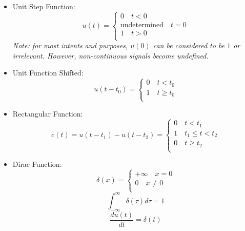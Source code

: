 \documentclass[nobib]{tufte-handout}
\begin{document}
\begin{itemize}
    \item Unit Step Function:
          \begin{equation*}
              u(t) = \left\{
              \begin{array}{l}
                  0 \quad t < 0                 \\
                  \text{undetermined} \quad t=0 \\
                  1 \quad t > 0                 \\
              \end{array}
              \right.
          \end{equation*}
          \textit{Note: for most intents and purposes, $u(0)$ can be considered to be $1$ or irrelevant. However, non-continuous signals become undefined.}
    \item Unit Function Shifted:
          \begin{equation*}
              u(t-t_0) = \left\{
              \begin{array}{l}
                  0 \quad t < t_0    \\
                  1 \quad t \geq t_0 \\
              \end{array}
              \right.
          \end{equation*}
    \item Rectangular Function:
          \begin{equation*}
              c(t) = u(t-t_1) - u(t-t_2) = \left\{
              \begin{array}{l}
                  0 \quad t < t_1          \\
                  1 \quad t_1 \leq t < t_2 \\
                  0 \quad t \geq t_2       \\
              \end{array}
              \right.
          \end{equation*}
    \item Dirac Function:
          \begin{equation*}
              \delta(x) = \left\{
              \begin{array}{l}
                  +\infty \quad x = 0 \\
                  0 \quad x \neq 0    \\
              \end{array}
              \right.
          \end{equation*}
          \begin{equation*}
              \int_{-\infty}^\infty \delta(\tau) d\tau = 1
          \end{equation*}
          \begin{equation*}
              \frac{du(t)}{dt} = \delta(t)
          \end{equation*}
\end{itemize}
\end{document}
